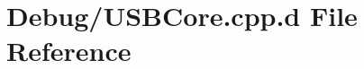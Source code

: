 \hypertarget{_debug_2_u_s_b_core_8cpp_8d}{\section{\-Debug/\-U\-S\-B\-Core.cpp.\-d \-File \-Reference}
\label{_debug_2_u_s_b_core_8cpp_8d}
}
